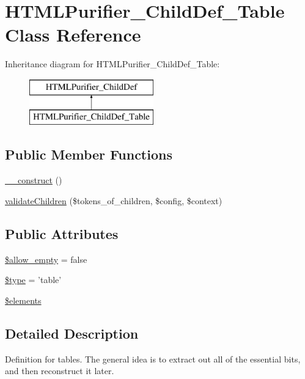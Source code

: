 \hypertarget{classHTMLPurifier__ChildDef__Table}{\section{H\+T\+M\+L\+Purifier\+\_\+\+Child\+Def\+\_\+\+Table Class Reference}
\label{classHTMLPurifier__ChildDef__Table}
}
Inheritance diagram for H\+T\+M\+L\+Purifier\+\_\+\+Child\+Def\+\_\+\+Table\+:\begin{figure}[H]
\begin{center}
\leavevmode
\includegraphics[height=2.000000cm]{classHTMLPurifier__ChildDef__Table}
\end{center}
\end{figure}
\subsection*{Public Member Functions}
\begin{DoxyCompactItemize}
\item 
\hyperlink{classHTMLPurifier__ChildDef__Table_acc3c3ec3b9746835631bb591233b40c6}{\+\_\+\+\_\+construct} ()
\item 
\hyperlink{classHTMLPurifier__ChildDef__Table_ace9eb0b90aa647a85132bf50cc531a59}{validate\+Children} (\$tokens\+\_\+of\+\_\+children, \$config, \$context)
\end{DoxyCompactItemize}
\subsection*{Public Attributes}
\begin{DoxyCompactItemize}
\item 
\hyperlink{classHTMLPurifier__ChildDef__Table_a3feef09bb10feb0e93384f7963f46a94}{\$allow\+\_\+empty} = false
\item 
\hyperlink{classHTMLPurifier__ChildDef__Table_aa47480c1b24895cb53cb7116dc1cbde4}{\$type} = 'table'
\item 
\hyperlink{classHTMLPurifier__ChildDef__Table_a7ca799c4fcc31910a301c8c92486df35}{\$elements}
\end{DoxyCompactItemize}


\subsection{Detailed Description}
Definition for tables. The general idea is to extract out all of the essential bits, and then reconstruct it later.

